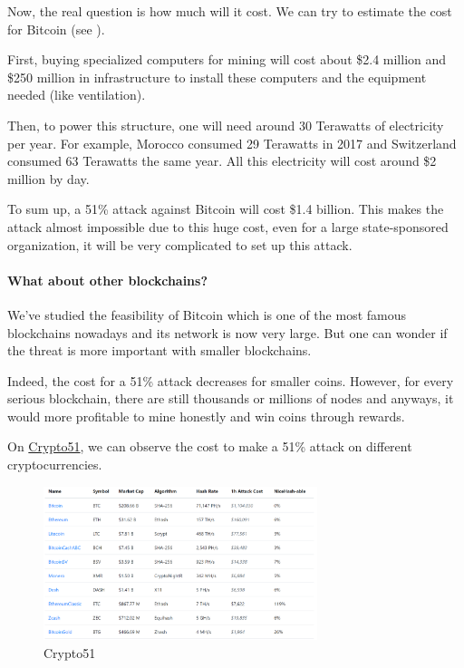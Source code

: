 Now, the real question is how much will it cost. We can try to estimate the cost for Bitcoin (see \cite{cost_bitcoin_51_attack}). \newline

First, buying specialized computers for mining will cost about \$2.4 million and \$250 million in infrastructure to install these computers and the equipment needed (like ventilation). \newline

Then, to power this structure, one will need around 30 Terawatts of electricity per year. For example, Morocco consumed 29 Terawatts in 2017 and Switzerland consumed 63 Terawatts the same year. All this electricity will cost around \$2 million by day. \newline

To sum up, a 51\% attack against Bitcoin will cost \$1.4 billion. This makes the attack almost impossible due to this huge cost, even for a large state-sponsored organization, it will be very complicated to set up this attack.

    \paragraph{What about other blockchains?}


We've studied the feasibility of Bitcoin which is one of the most famous blockchains nowadays and its network is now very large. But one can wonder if the threat is more important with smaller blockchains. \newline

Indeed, the cost for a 51\% attack decreases for smaller coins. However, for every serious blockchain, there are still thousands or millions of nodes and anyways, it would more profitable to mine honestly and win coins through rewards.

On \href{https://www.crypto51.app/}{Crypto51}, we can observe the cost to make a 51\% attack on different cryptocurrencies. \newline

\begin{figure}[h]
\centering
\includegraphics[width=8cm]{Figures/crypto51}
\caption{Crypto51}
\end{figure}
\medskip


